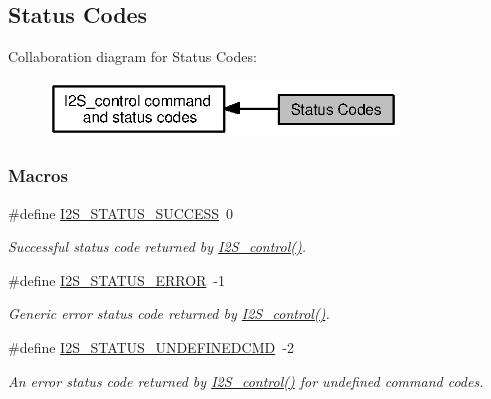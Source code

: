 \subsection{Status Codes}
\label{group___i2_s___s_t_a_t_u_s}
Collaboration diagram for Status Codes\+:
\nopagebreak
\begin{figure}[H]
\begin{center}
\leavevmode
\includegraphics[width=263pt]{group___i2_s___s_t_a_t_u_s}
\end{center}
\end{figure}
\subsubsection*{Macros}
\begin{DoxyCompactItemize}
\item 
\#define \hyperlink{group___i2_s___s_t_a_t_u_s_ga23118b46858671b6537d3a68721f0282}{I2\+S\+\_\+\+S\+T\+A\+T\+U\+S\+\_\+\+S\+U\+C\+C\+E\+S\+S}~0
\begin{DoxyCompactList}\small\item\em Successful status code returned by \hyperlink{_i2_s_8h_a1af19b22e9036bee696b4e4efe4916b0}{I2\+S\+\_\+control()}. \end{DoxyCompactList}\item 
\#define \hyperlink{group___i2_s___s_t_a_t_u_s_ga775a6dc5aa644d4cca2179afbafb63ad}{I2\+S\+\_\+\+S\+T\+A\+T\+U\+S\+\_\+\+E\+R\+R\+O\+R}~-\/1
\begin{DoxyCompactList}\small\item\em Generic error status code returned by \hyperlink{_i2_s_8h_a1af19b22e9036bee696b4e4efe4916b0}{I2\+S\+\_\+control()}. \end{DoxyCompactList}\item 
\#define \hyperlink{group___i2_s___s_t_a_t_u_s_ga649cf0c869381728fc9b56dfdbbd3e3d}{I2\+S\+\_\+\+S\+T\+A\+T\+U\+S\+\_\+\+U\+N\+D\+E\+F\+I\+N\+E\+D\+C\+M\+D}~-\/2
\begin{DoxyCompactList}\small\item\em An error status code returned by \hyperlink{_i2_s_8h_a1af19b22e9036bee696b4e4efe4916b0}{I2\+S\+\_\+control()} for undefined command codes. \end{DoxyCompactList}\end{DoxyCompactItemize}


